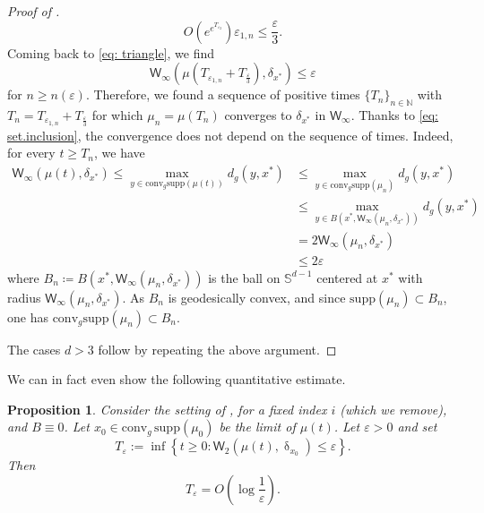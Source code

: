 \documentclass[a4paper,11pt]{article}
\theoremstyle{plain}
\newtheorem{proposition}[theorem]{Proposition}
\newcommand{\supp}{\mathrm{supp}}
\newcommand{\conv}{\mathrm{conv}}
\renewcommand{\S}{\mathbb{S}^{d-1}}
\newcommand{\bB}{\bm{\mathit{B}}}
\renewcommand{\leq}{\leqslant}
\renewcommand{\geq}{\geqslant}
\numberwithin{equation}{section}
\begin{document}
\begin{proof}[Proof of ]
\begin{equation*}
    O\left(e^{e^{T_{\varepsilon_2}}}\right)\varepsilon_{1,n}\leq \frac{\varepsilon}{3}.
\end{equation*}
Coming back to \eqref{eq: triangle}, we find 
\begin{equation*}
    \mathsf{W}_{\infty}\left(\mu\left(T_{\varepsilon_{1,n}}+T_{\frac{\varepsilon}{3}}\right),\delta_{x^*}\right)\leq \varepsilon
\end{equation*}
for $n\geq n(\varepsilon)$. Therefore, we found a sequence of positive times $\{T_n\}_{n\in \mathbb{N}}$ with $T_n=T_{\varepsilon_{1,n}}+T_{\frac{\varepsilon}{3}}$ for which $\mu_n=\mu(T_n)$ converges to $\delta_{x^*}$ in $\mathsf{W}_\infty$. Thanks to  \eqref{eq: set.inclusion}, the convergence does not depend on the sequence of times. Indeed, for every $t\geq T_n$, we have
\begin{align*}
    \mathsf{W}_\infty(\mu(t),\delta_{x^*})\leq\max_{y\in \mathrm{conv}_g\supp(\mu(t))}d_g(y,x^*)&\leq \max_{y\in \mathrm{conv}_g\supp(\mu_n)}d_g(y,x^*)\\
    &\leq\max_{y\in B(x^*,\mathsf{W}_\infty(\mu_n,\delta_{x^*}))}d_g(y,x^*)\\
    &=2\mathsf{W}_\infty(\mu_n,\delta_{x^*})\\
    &\leq 2\varepsilon
\end{align*}
where $B_n\coloneqq B(x^*,\mathsf{W}_\infty(\mu_n,\delta_{x^*}))$ is the ball on $\S$ centered at $x^*$ with radius $\mathsf{W}_\infty(\mu_n,\delta_{x^*})$. As $B_n$ is geodesically convex, and since $\supp(\mu_n)\subset B_n$, one has  $\mathrm{conv}_g\supp(\mu_n)\subset B_n$.

The cases $d>3$ follow by repeating the above argument.
\end{proof}

We can in fact even show the following quantitative estimate.

\begin{proposition} \label{cl: cluster.rate}
Consider the setting of , for a fixed index $i$ (which we remove), and $\bB\equiv0$. Let $x_0\in\conv_g\,\supp(\mu_0)$ be the limit of $\mu(t)$.
Let $\varepsilon>0$ and set 
\begin{equation*}
T_\varepsilon:=%
\inf \left\{t\geq 0\colon \mathsf{W}_2(\mu(t),\updelta_{x_0})\leq \varepsilon\right\}.
\end{equation*}
Then 
\begin{equation*} 
T_\varepsilon=O\left(\log\frac{1}{\varepsilon}\right).
\end{equation*}
\end{proposition}
\end{document}
